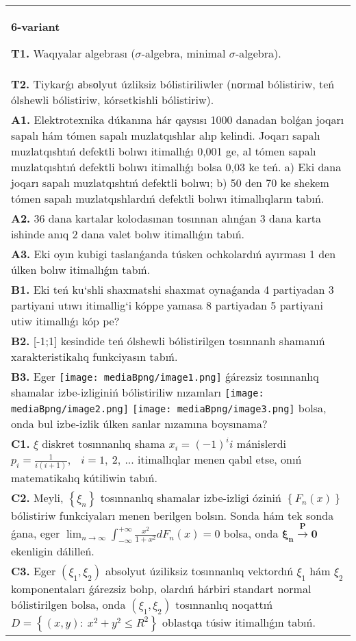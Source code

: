 \documentclass{article}
\begin{document}
\begin{tabular}{m{17cm}}
\textbf{6-variant}
\newline

\textbf{T1.} Waqıyalar algebrası ($\sigma$-algebra, minimal $\sigma$-algebra).
 \\
\textbf{T2.} Tiykarǵı аbsоlyut úzliksiz bólistiriliwler (nоrmаl bólistiriw, teń ólshewli bólistiriw, kórsetkishli bólistiriw). 
 \\
\textbf{A1.} Elektrotexnika dúkanına hár qaysısı 1000 danadan bolǵan joqarı sapalı hám tómen sapalı muzlatqıshlar alıp kelindi. Joqarı sapalı muzlatqıshtıń defektli bolıwı itimallıǵı 0,001 ge, al tómen sapalı muzlatqıshtıń defektli bolıwı itimallıǵı bolsa 0,03 ke teń. a) Eki dana joqarı sapalı muzlatqıshtıń defektli bolıwı; b) 50 den 70 ke shekem tómen sapalı muzlatqıshlardıń defektli bolıwı itimallıqların tabıń.
 \\
\textbf{A2.} 36 dana kartalar kolodasınan tosınnan alınǵan 3 dana karta ishinde anıq 2 dana valet bolıw itimallıǵın tabıń.
 \\
\textbf{A3.} Eki oyın kubigi taslanǵanda túsken ochkolardıń ayırması 1 den úlken bolıw itimallıǵın tabıń.
 \\
\textbf{B1.} Eki teń ku`shli shaxmatshi shaxmat oynaǵanda 4 partiyadan 3 partiyani utıwı itimallig`i kóppe yamasa 8 partiyadan 5 partiyani utiw itimallıǵı kóp pe?
 \\
\textbf{B2.} {[}-1;1{]} kesindide teń ólshewli bólistirilgen tosınnanlı shamanıń xarakteristikalıq funkciyasın tabıń.
 \\
\textbf{B3.} 
Eger \texttt{[image: mediaBpng/image1.png]} ǵárezsiz tosınnanlıq shamalar izbe-izliginiń bólistiriliw nızamları
\texttt{[image: mediaBpng/image2.png]} \texttt{[image: mediaBpng/image3.png]}
bolsa, onda bul izbe-izlik úlken sanlar nızamına boysınama?
 \\
\textbf{C1.} 
\(\xi\) diskret tosınnanlıq shama \(x_{i} = ( - 1)^{i}i\) mánislerdi \(p_{i} = \frac{1}{i(i + 1)},\) \(\ \ i = 1,\ 2,\ ...\) itimallıqlar menen qabıl etse, onıń matematikalıq kútiliwin tabıń.
 \\
\textbf{C2.} Meyli, \(\left\{ \xi_{n} \right\}\) tosınnanlıq shamalar izbe-izligi óziniń \(\left\{ F_{n}(x) \right\}\) bólistiriw funkciyaları menen berilgen bolsın. Sonda hám tek sonda ǵana, eger \(\lim_{n \rightarrow \infty}\int_{- \infty}^{+ \infty}{\frac{x^{2}}{1 + x^{2}}dF_{n}(x)} = 0\) bolsa, onda \(\mathbf{\xi}_{\mathbf{n}}\overset{\mathbf{P}}{\rightarrow}\mathbf{0}\) ekenligin dálilleń.
 \\
\textbf{C3.} Eger \(\left( \xi_{1},\xi_{2} \right)\) absolyut úziliksiz tosınnanlıq vektordıń \(\xi_{1}\) hám \(\xi_{2}\) komponentaları ǵárezsiz bolıp, olardıń hárbiri standart normal bólistirilgen bolsa, onda \(\left( \xi_{1},\xi_{2} \right)\) tosınnanlıq noqattıń \(D = \left\{ (x,y):\ x^{2} + y^{2} \leq R^{2} \right\}\) oblastqa túsiw itimallıǵın tabıń.
 \\

\end{tabular}
\vspace{1cm}
\end{document}
